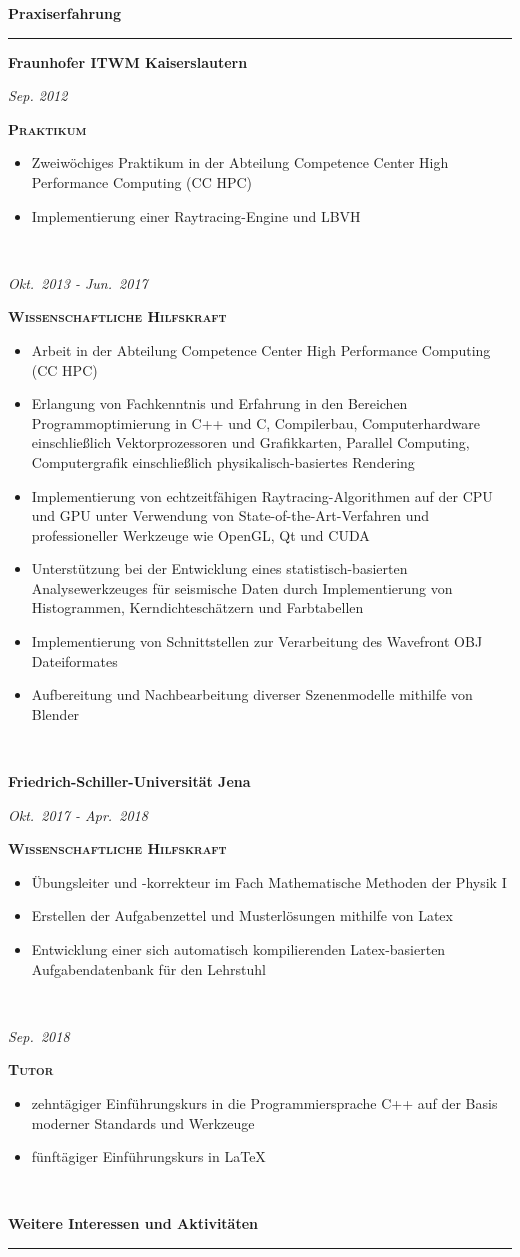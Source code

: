 \documentclass[8pt]{article}
\newcommand{\cvSection}[1]{
  \medskip
  {\Large \color{cvColor} \textbf{#1}}\\
  \parbox{\linewidth}{\rule{\linewidth}{1pt}}
  \par
}
\newcommand{\cvEducationHeading}[2]{%
  {\centering\colorbox{cvBackgroundColor}{\parbox{0.98\linewidth}{\textbf{#1} \hfill \textit{\footnotesize #2}}}} \par
}
\newenvironment{cvEducationItem}[2]{
  \medskip
  \par
  \begin{minipage}[c]{0.15\linewidth}
    \raggedleft
    \footnotesize
    \textit{#1}
  \end{minipage}
  \quad
  \vrule
  \quad
  \begin{minipage}[t]{0.7\linewidth}
    \textsc{\color{cvColor} \textbf{#2}}
    \footnotesize
    \begin{itemize}[itemsep=-1mm, leftmargin=3mm]
}{
    \end{itemize}
  \end{minipage}
  \\[0.5em]
}
\begin{document}
  \cvSection{Praxiserfahrung}
  \cvEducationHeading{Fraunhofer ITWM Kaiserslautern}{}
  \begin{cvEducationItem}{Sep. 2012}{Praktikum}
    \item Zweiwöchiges Praktikum in der Abteilung Competence Center High Performance Computing (CC HPC)
    \item Implementierung einer Raytracing-Engine und LBVH
  \end{cvEducationItem}
  \begin{cvEducationItem}{Okt.~2013 - Jun.~2017}{Wissenschaftliche Hilfskraft}
    \item Arbeit in der Abteilung Competence Center High Performance Computing (CC HPC)
    \item Erlangung von Fachkenntnis und Erfahrung in den Bereichen Programmoptimierung in C++ und C, Compilerbau, Computerhardware einschließlich Vektorprozessoren und Grafikkarten, Parallel Computing, Computergrafik einschließlich physikalisch-basiertes Rendering
    \item Implementierung von echtzeitfähigen Raytracing-Algorithmen auf der CPU und GPU unter Verwendung von State-of-the-Art-Verfahren und professioneller Werkzeuge wie OpenGL, Qt und CUDA
    \item Unterstützung bei der Entwicklung eines statistisch-basierten Analysewerkzeuges für seismische Daten durch Implementierung von Histogrammen, Kerndichteschätzern und Farbtabellen
    \item Implementierung von Schnittstellen zur Verarbeitung des Wavefront OBJ Dateiformates
    \item Aufbereitung und Nachbearbeitung diverser Szenenmodelle mithilfe von Blender
  \end{cvEducationItem}

  \cvEducationHeading{Friedrich-Schiller-Universität Jena}{}
  \begin{cvEducationItem}{Okt.~2017 - Apr.~2018}{Wissenschaftliche Hilfskraft}
    \item Übungsleiter und -korrekteur im Fach Mathematische Methoden der Physik I
    \item Erstellen der Aufgabenzettel und Musterlösungen mithilfe von Latex
    \item Entwicklung einer sich automatisch kompilierenden Latex-basierten Aufgabendatenbank für den Lehrstuhl
  \end{cvEducationItem}
  \begin{cvEducationItem}{Sep.~2018}{Tutor}
    \item zehntägiger Einführungskurs in die Programmiersprache C++ auf der Basis moderner Standards und Werkzeuge
    \item fünftägiger Einführungskurs in LaTeX
  \end{cvEducationItem}

  \cvSection{Weitere Interessen und Aktivitäten}
\end{document}
